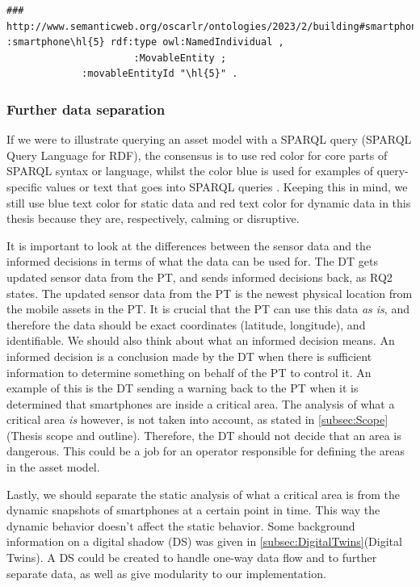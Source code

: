 \documentclass{article}
\begin{document}
\begin{Verbatim}[commandchars=\\\{\}, breakanywhere=true]
### http://www.semanticweb.org/oscarlr/ontologies/2023/2/building#smartphone\hl{5}
:smartphone\hl{5} rdf:type owl:NamedIndividual ,
                      :MovableEntity ;
             :movableEntityId "\hl{5}" .
\end{Verbatim}

\subsubsection{Further data separation}
If we were to illustrate querying an asset model with a SPARQL query (SPARQL Query Language for RDF), the consensus is to use red color for core parts of SPARQL syntax or language, whilst the color blue is used for examples of query-specific values or text that goes into SPARQL queries \cite{noauthor_sparql_nodate}. Keeping this in mind, we still use blue text color for static data and red text color for dynamic data in this thesis because they are, respectively, calming or disruptive. 

It is important to look at the differences between the sensor data and the informed decisions in terms of what the data can be used for. The DT gets updated sensor data from the PT, and sends informed decisions back, as RQ2 states. The updated sensor data from the PT is the newest physical location from the mobile assets in the PT. It is crucial that the PT can use this data \emph{as is}, and therefore the data should be exact coordinates (latitude, longitude), and identifiable. We should also think about what an informed decision means. An informed decision is a conclusion made by the DT when there is sufficient information to determine something on behalf of the PT to control it. An example of this is the DT sending a warning back to the PT when it is determined that smartphones are inside a critical area. The analysis of what a critical area \emph{is} however, is not taken into account, as stated in \ref{subsec:Scope}(Thesis scope and outline). Therefore, the DT should not decide that an area is dangerous. This could be a job for an operator responsible for defining the areas in the asset model.

Lastly, we should separate the static analysis of what a critical area is from the dynamic snapshots of smartphones at a certain point in time. This way the dynamic behavior doesn't affect the static behavior. Some background information on a digital shadow (DS) was given in \ref{subsec:DigitalTwins}(Digital Twins). A DS could be created to handle one-way data flow and to further separate data, as well as give modularity to our implementation.
\end{document}
